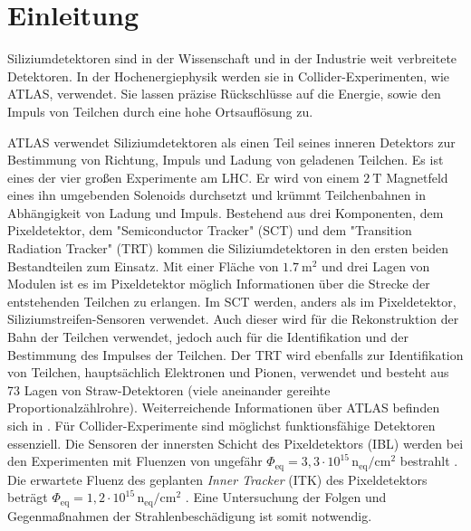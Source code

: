 \chapter{Einleitung}
Siliziumdetektoren sind in der Wissenschaft und in der Industrie weit verbreitete
Detektoren. In der Hochenergiephysik werden sie in Collider-Experimenten, wie ATLAS, verwendet.
Sie  lassen präzise Rückschlüsse auf die Energie, sowie den Impuls von Teilchen durch eine
hohe Ortsauflösung zu.


ATLAS verwendet Siliziumdetektoren als
einen Teil seines inneren Detektors zur Bestimmung von Richtung, Impuls
und Ladung von geladenen Teilchen. Es ist eines der vier großen Experimente am LHC.
Er wird von einem $\SI{2}{\tesla}$ Magnetfeld eines ihn umgebenden Solenoids
durchsetzt und krümmt Teilchenbahnen in Abhängigkeit von Ladung und Impuls.
Bestehend aus drei Komponenten, dem Pixeldetektor, dem "Semiconductor Tracker" (SCT) und dem "Transition Radiation Tracker" (TRT) kommen  die
Siliziumdetektoren in den ersten beiden Bestandteilen zum Einsatz.
Mit einer Fläche von $\SI{1.7}{\meter\squared}$ und drei Lagen von Modulen
ist es im Pixeldetektor möglich
Informationen über die Strecke der entstehenden Teilchen zu erlangen.
Im SCT werden, anders als im Pixeldetektor, Siliziumstreifen-Sensoren verwendet.
Auch dieser wird für
die Rekonstruktion der Bahn der Teilchen verwendet, jedoch auch für die Identifikation und der Bestimmung des Impulses der Teilchen.
Der TRT wird ebenfalls zur Identifikation von Teilchen, hauptsächlich Elektronen und Pionen, verwendet und besteht aus 73 Lagen
von Straw-Detektoren (viele aneinander gereihte Proportionalzählrohre).
Weiterreichende Informationen über ATLAS befinden sich in \cite{ATLAS}.
Für Collider-Experimente sind möglichst funktionsfähige Detektoren essenziell.
Die Sensoren der innersten Schicht des Pixeldetektors (IBL)
werden bei den Experimenten mit Fluenzen von ungefähr $\Phi_{\mathrm{eq}} =3,3\cdot 10^{15} \, \mathrm{n_{eq}/cm^2}$ bestrahlt \cite{Capeans:1291633}.
Die erwartete Fluenz des geplanten \textit{Inner Tracker} (ITK) des Pixeldetektors beträgt
$\Phi_{\mathrm{eq}} =1,2\cdot 10^{15} \, \mathrm{n_{eq}/cm^2}$ \cite{itk}. Eine Untersuchung
der Folgen und Gegenmaßnahmen der Strahlenbeschädigung ist somit notwendig.


